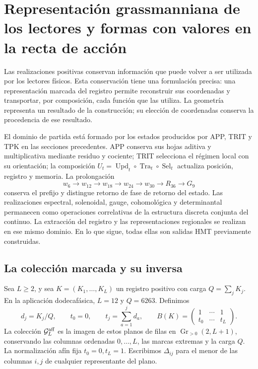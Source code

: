\section{Representación grassmanniana de los lectores y formas con valores en la recta de acción}
\label{sec:compat-lectores-formas}

Las realizaciones positivas conservan información que puede volver a ser
utilizada por los lectores físicos. Esta conservación tiene una formulación
precisa: una representación marcada del registro permite reconstruir sus
coordenadas y transportar, por composición, cada función que las utiliza.
La geometría representa un resultado de la construcción; su elección de
coordenadas conserva la procedencia de ese resultado.

El dominio de partida está formado por los estados producidos por APP,
TRIT y TPK en las secciones precedentes. APP conserva sus hojas aditiva y
multiplicativa mediante residuo y cociente; TRIT selecciona el régimen
local con su orientación; la composición
\(U_t=\operatorname{Upd}_t\circ\operatorname{Tra}_t\circ
\operatorname{Sel}_t\) actualiza posición, registro y memoria.
La prolongación
\[
 w_6\longrightarrow w_{12}\longrightarrow w_{18}\longrightarrow
 w_{24}\longrightarrow w_{30}\longrightarrow R_{36}\longrightarrow G_9
\]
conserva el prefijo y distingue retorno de fase de retorno del estado.
Las realizaciones espectral, solenoidal, gauge, cohomológica y determinantal
permanecen como operaciones correlativas de la estructura discreta
conjunta del continuo. La extracción del registro y las representaciones
regionales se realizan en ese mismo dominio. En lo que sigue, todas ellas
son salidas HMT previamente construidas.

\subsection{La colección marcada y su inversa}

Sea \(L\geq2\), y sea \(K=(K_1,\ldots,K_L)\) un registro positivo
con carga \(Q=\sum_jK_j\). En la aplicación dodecafásica,
\(L=12\) y \(Q=6263\). Definimos
\[
 d_j=K_j/Q,\qquad t_0=0,\qquad
 t_j=\sum_{a=1}^{j}d_a,\qquad
 B(K)=\begin{pmatrix}1&\cdots&1\\t_0&\cdots&t_L\end{pmatrix}.
\]
La colección \(\mathcal G_L^{\rm aff}\) es la imagen de estos planos
de filas en \(\operatorname{Gr}_{>0}(2,L+1)\), conservando las
columnas ordenadas \(0,\ldots,L\), las marcas extremas y la carga
\(Q\). La normalización afín fija \(t_0=0,t_L=1\).
Escribimos \(\Delta_{ij}\) para el menor de las columnas \(i,j\)
de cualquier representante del plano.

